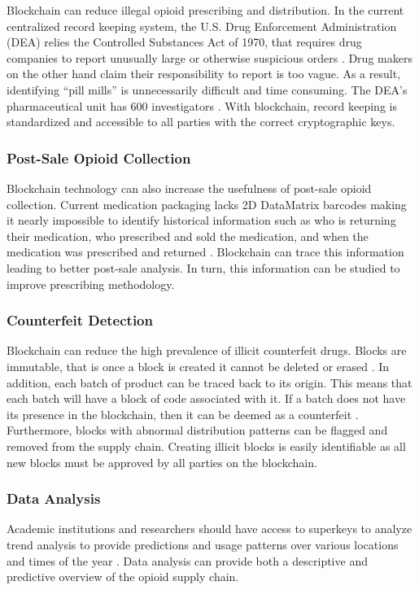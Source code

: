 \documentclass[sigconf]{acmart}
\begin{document}
Blockchain can reduce illegal opioid prescribing and distribution. In the current centralized record keeping system, the U.S. Drug Enforcement Administration (DEA) relies the Controlled Substances Act of 1970, that requires drug companies to report unusually large or otherwise suspicious orders \cite{Higham01}. Drug makers on the other hand claim their responsibility to report is too vague.  As a result, identifying ``pill mills'' is unnecessarily difficult and time consuming. The DEA's pharmaceutical unit has 600 investigators \cite{Higham01}. With blockchain, record keeping is standardized and accessible to all parties with the correct cryptographic keys. 

\subsubsection{Post-Sale Opioid Collection} Blockchain technology can also increase the usefulness of post-sale opioid collection. Current medication packaging lacks 2D DataMatrix barcodes making it nearly impossible to identify historical information such as who is returning their medication, who prescribed and sold the medication, and when the medication was prescribed and returned \cite{Walles01}. Blockchain can trace this information leading to better post-sale analysis. In turn, this information can be studied to improve prescribing methodology.
\subsubsection{Counterfeit Detection} Blockchain can reduce the high prevalence of illicit counterfeit drugs. Blocks are immutable, that is once a block is created it cannot be deleted or erased \cite{hitchingHealthcare}. In addition, each batch of product can be traced back to its origin. This means that each batch will have a block of code associated with it. If a batch does not have its presence in the blockchain, then it can be deemed as a counterfeit \cite{arbc2}. Furthermore, blocks with abnormal distribution patterns can be flagged and removed from the supply chain. Creating illicit blocks is easily identifiable as all new blocks must be approved by all parties on the blockchain. 
\subsubsection{Data Analysis} Academic institutions and researchers should have access to superkeys to analyze trend analysis to provide predictions and usage patterns over various locations and times of the year \cite{arbc5}. Data analysis can provide both a descriptive and predictive overview of the opioid supply chain. 
\end{document}

